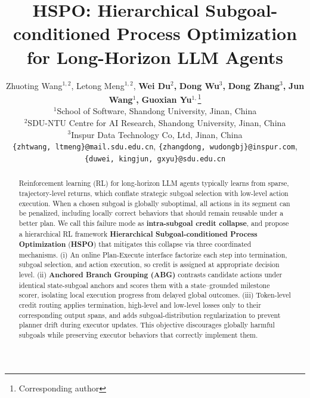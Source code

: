 \documentclass{article}
\title{HSPO: Hierarchical Subgoal-conditioned Process Optimization for Long-Horizon LLM Agents}
\author{
Zhuoting Wang$^{1,2}$, Letong Meng$^{1,2}$, 
\textbf{Wei Du}$^2$\textbf{,} \textbf{Dong Wu}$^3$\textbf{,} \textbf{Dong Zhang}$^3$\textbf{,} \textbf{Jun Wang}$^1$\textbf{,} \textbf{Guoxian Yu}$^{1,}$\thanks{Corresponding author} \\
$^1$School of Software, Shandong University, Jinan, China \\
$^2$SDU-NTU Centre for AI Research, Shandong University, Jinan, China \\
$^3$Inspur Data Technology Co, Ltd, Jinan, China\\
\texttt{\{zhtwang, ltmeng\}@mail.sdu.edu.cn},  \texttt{\{zhangdong, wudongbj\}@inspur.com}, \\ \texttt{\{duwei, kingjun, gxyu\}@sdu.edu.cn}
}
\newcommand{\wei}[1]{\textcolor{red}{#1}}
\begin{document}
\maketitle
\begin{abstract}
Reinforcement learning (RL) for long-horizon LLM agents typically learns from sparse, trajectory-level returns, which conflate strategic subgoal selection with low-level action execution. When a chosen subgoal is globally suboptimal, all actions in its segment can be penalized, including locally correct behaviors that should remain reusable under a better plan. We call this failure mode as \textbf{intra-subgoal credit collapse}, and propose a hierarchical RL framework \textbf{Hierarchical Subgoal-conditioned Process Optimization} (\textbf{HSPO}) that mitigates this collapse via three coordinated mechanisms. (i) An online Plan-Execute interface factorize each step into termination, subgoal selection, and action execution, so credit is assigned at appropriate decision level. (ii)  \textbf{Anchored Branch Grouping (ABG)} contrasts candidate actions under identical state-subgoal anchors and scores them with a state--grounded milestone scorer, isolating local execution progress from delayed global outcomes. (iii) Token-level credit routing applies termination, high-level and low-level losses only to their corresponding output spans, and adds subgoal-distribution regularization to prevent planner drift during executor updates. This objective discourages globally harmful subgoals while preserving executor behaviors that correctly implement them.
\end{abstract}


\end{document}
